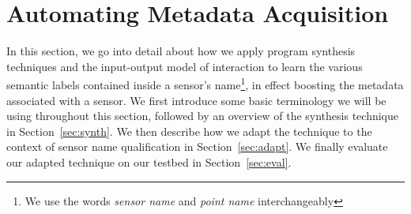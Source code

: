 \section{Automating Metadata Acquisition}
%
%

In this section, we go into detail about how we apply program synthesis techniques and the input-output model of interaction to learn the various semantic labels contained inside a sensor's name\footnote{We use the words {\it sensor name} and {\it point name} interchangeably }, in effect boosting the metadata associated with a sensor.  We first introduce some basic terminology we will be using throughout this section, followed by an overview of the synthesis technique in Section~\ref{sec:synth}. We then describe how we adapt the technique to the context of sensor name qualification in Section~\ref{sec:adapt}.  We finally evaluate our adapted technique on our testbed in Section~\ref{sec:eval}.

%

